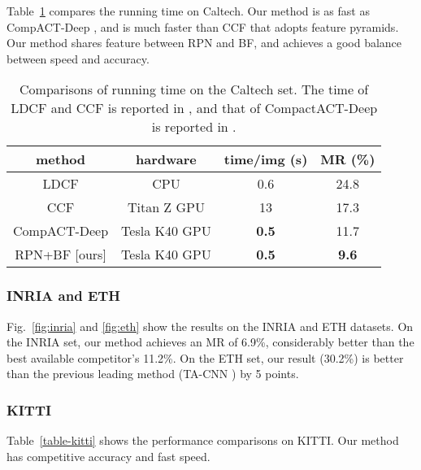 \documentclass[runningheads]{llncs}
\begin{document}
Table~\ref{table-time} compares the running time on Caltech. Our method is as fast as  CompACT-Deep \cite{cai2015learning}, and is much faster than CCF \cite{yang2015convolutional} that adopts feature pyramids. Our method shares feature between RPN and BF, and achieves a good balance between speed and accuracy. 


\renewcommand\arraystretch{1.25}
\setlength{\tabcolsep}{6pt}
\begin{table}[t]
\begin{center}
\begin{tabular}{c|c|c|c}
\hline
method  & hardware & time/img (s) & MR (\%) \\
\hline\hline
LDCF \cite{nam2014local}  & CPU & 0.6 & 24.8\\
CCF \cite{yang2015convolutional}  & Titan Z GPU & 13 & 17.3 \\
CompACT-Deep \cite{cai2015learning}  & Tesla K40 GPU & \textbf{0.5} & 11.7 \\
\hline
RPN+BF [ours]  & Tesla K40 GPU & \textbf{0.5} & \textbf{9.6} \\
\hline
\end{tabular}
\end{center}
\caption{Comparisons of running time on the Caltech set. The time of LDCF and CCF is reported in \cite{yang2015convolutional}, and that of CompactACT-Deep is reported in \cite{cai2015learning}.}
\label{table-time}
\end{table}

\subsubsection{INRIA and ETH} Fig.~\ref{fig:inria} and \ref{fig:eth} show the results on the INRIA and ETH datasets. On the INRIA set, our method achieves an MR of 6.9\%, considerably better than the best available competitor's 11.2\%. On the ETH set, our result (30.2\%) is better than the previous leading method (TA-CNN \cite{tian2015pedestrian}) by 5 points.


\subsubsection{KITTI} Table~\ref{table-kitti} shows the performance comparisons on KITTI. Our method has competitive accuracy and fast speed.
\end{document}
